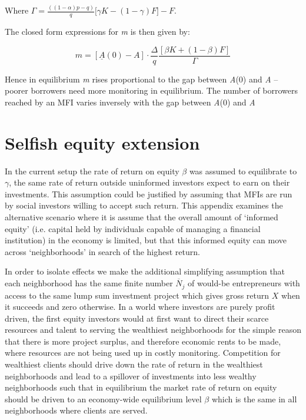\documentclass[letterpaper, 12pt]{article}
\begin{document}
\begin{appendices}
Where
\(\Gamma = \frac{((1 - \alpha)p - q)}{q}\lbrack\gamma K - (1 - \gamma)F\rbrack - F\).

The closed form expressions for \emph{m} is then given by:

\begin{equation}
m=[\underline{A}(0)-A] \cdot \frac{\Delta}{q} \frac{[\beta K+(1-\beta) F]}{\Gamma}
\end{equation}

Hence in equilibrium \emph{m} rises proportional to the gap between \emph{{A}}(0) and \emph{A} -- poorer borrowers need more monitoring in
equilibrium. The number of borrowers reached by an MFI varies inversely
with the gap between \emph{{A}}(0) and \emph{A}

\section{Selfish equity extension}

In the current setup the rate of return on equity $\beta$ was assumed to
equilibrate to $\gamma$, the same rate of return outside uninformed investors expect to earn on their investments. This assumption could be justified by assuming that MFIs are run by social investors willing to accept such return. This appendix examines the alternative scenario where it is assume that the overall amount of `informed equity' (i.e. capital held by individuals capable of managing a financial institution) in the
economy is limited, but that this informed equity can move across `neighborhoods' in search of the highest return.

In order to isolate effects we make the additional simplifying assumption that each neighborhood has the same finite number \({\overline{N}}_{j}\) of would-be entrepreneurs with access to the same lump sum investment project which gives gross return $X$ when it
succeeds and zero otherwise. In a world where investors are purely profit driven, the first equity investors would at first want to direct
their scarce resources and talent to serving the wealthiest neighborhoods for the simple reason that there is more project surplus,
and therefore economic rents to be made, where resources are not being
used up in costly monitoring. Competition for wealthiest clients should drive down the rate of return in the wealthiest neighborhoods and lead
to a spillover of investments into less wealthy neighborhoods such that in equilibrium the market rate of return on equity should be driven to
an economy-wide equilibrium level $\beta$ which is the same in all neighborhoods where clients are served.


\end{appendices}
\end{document}
